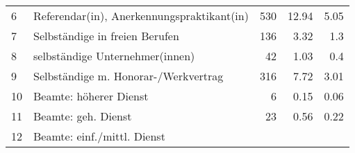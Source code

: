 \begin{longtable}{lXrrr}
     6 &
     \multicolumn{1}{X}{ Referendar(in), Anerkennungspraktikant(in)   } &


       \num{530} &
       \num[round-mode=places,round-precision=2]{12,94} &
         \num[round-mode=places,round-precision=2]{5,05} \\

     7 &
     \multicolumn{1}{X}{ Selbständige in freien Berufen   } &


       \num{136} &
       \num[round-mode=places,round-precision=2]{3,32} &
         \num[round-mode=places,round-precision=2]{1,3} \\

     8 &
     \multicolumn{1}{X}{ selbständige Unternehmer(innen)   } &


       \num{42} &
       \num[round-mode=places,round-precision=2]{1,03} &
         \num[round-mode=places,round-precision=2]{0,4} \\

     9 &
     \multicolumn{1}{X}{ Selbständige m. Honorar-/Werkvertrag   } &


       \num{316} &
       \num[round-mode=places,round-precision=2]{7,72} &
         \num[round-mode=places,round-precision=2]{3,01} \\

     10 &
     \multicolumn{1}{X}{ Beamte: höherer Dienst   } &


       \num{6} &
       \num[round-mode=places,round-precision=2]{0,15} &
         \num[round-mode=places,round-precision=2]{0,06} \\

     11 &
     \multicolumn{1}{X}{ Beamte: geh. Dienst   } &


       \num{23} &
       \num[round-mode=places,round-precision=2]{0,56} &
         \num[round-mode=places,round-precision=2]{0,22} \\

     12 &
     \multicolumn{1}{X}{ Beamte: einf./mittl. Dienst   } &



\end{longtable}
